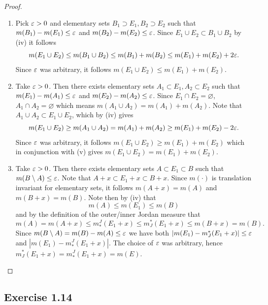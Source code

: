 \documentclass[hw_all.tex]{subfiles}
\begin{document}
\begin{proof}
\begin{enumerate}
        \item[(v)] 
            Pick $\varepsilon > 0$ and elementary sets $B_1 \supset E_1, B_2 \supset E_2$ such that $m(B_1) - m(E_1) \leq \varepsilon$ and $m(B_2) - m(E_2) \leq \varepsilon$. Since $E_1 \cup E_2 \subset B_1 \cup B_2$ by (iv) it follows
            \[
                m(E_1 \cup E_2) \leq m(B_1 \cup B_2) \leq m(B_1) + m(B_2) \leq m(E_1) + m(E_2) + 2\varepsilon
            .\]
            Since $\varepsilon$ was arbitrary, it follows $m(E_1 \cup E_2) \leq m(E_1) + m(E_2)$.

        \item[(iii)] 
            Take $\varepsilon > 0$. Then there exists elementary sets $A_1 \subset E_1, A_2 \subset E_2$ such that $m(E_1) - m(A_1) \leq \varepsilon$ and $m(E_2) - m(A_2) \leq \varepsilon$. Since $E_1 \cap E_2 = \varnothing$, $A_1 \cap A_2 = \varnothing$ which means $m(A_1 \cup A_2) = m(A_1) + m(A_2)$. Note that $A_1 \cup A_2 \subset E_1 \cup E_2$, which by (iv) gives
            \[
                m(E_1 \cup E_2) \geq m(A_1 \cup A_2) = m(A_1) + m(A_2) \geq m(E_1) + m(E_2) - 2\varepsilon
            .\]
            Since $\varepsilon$ was arbitrary, it follows $m(E_1 \cup E_2) \geq m(E_1) + m(E_2)$ which in conjunction with (v) gives $m(E_1 \cup E_2) = m(E_1) + m(E_2)$.

        \item[(vi)] 
            Take $\varepsilon > 0$. Then there exists elementary sets $A \subset E_1 \subset B$ such that $m(B \setminus A) \leq \varepsilon$. Note that $A+x \subset E_1 + x \subset B+x$. Since $m(\cdot)$ is translation invariant for elementary sets, it follows $m(A+x) = m(A)$ and $m(B+x) = m(B)$. Note then by (iv) that
            \[
                m(A) \leq m(E_1) \leq m(B) 
            \]
            and by the definition of the outer/inner Jordan measure that
            \[
                m(A) = m(A+x) \leq m^J_*(E_1+x) \leq m_J^*(E_1+x) \leq m(B+x) = m(B)
            .\]
            Since $m(B \setminus A) = m(B) - m(A) \leq \varepsilon$ we have both $|m(E_1) - m_J^*(E_1+x)| \leq \varepsilon$ and $|m(E_1) - m^J_*(E_1+x)|$. The choice of $\varepsilon$ was arbitrary, hence $m_J^*(E_1 + x) = m^J_*(E_1+x) = m(E)$.

    \end{enumerate}
\end{proof}

\subsection{Exercise 1.14}
\end{document}
